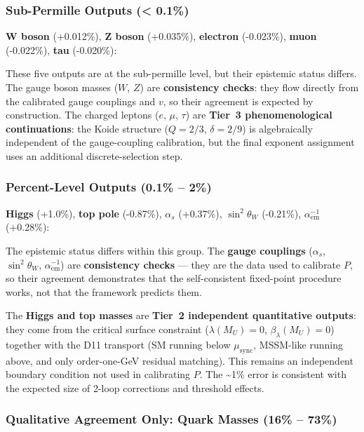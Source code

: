 \subsubsection{Sub-Permille Outputs (\textless{} 0.1\%)}\label{111-sub-permille-outputs--01}

\textbf{W boson} (+0.012\%), \textbf{Z boson} (+0.035\%), \textbf{electron} (-0.023\%), \textbf{muon} (-0.022\%), \textbf{tau} (-0.020\%):

These five outputs are at the sub-permille level, but their epistemic status differs. The gauge boson masses (\(W\), \(Z\)) are \textbf{consistency checks}: they flow directly from the calibrated gauge couplings and \(v\), so their agreement is expected by construction. The charged leptons (\(e\), \(\mu\), \(\tau\)) are \textbf{Tier~3 phenomenological continuations}: the Koide structure (\(Q = 2/3\), \(\delta = 2/9\)) is algebraically independent of the gauge-coupling calibration, but the final exponent assignment uses an additional discrete-selection step.

\subsubsection{Percent-Level Outputs (0.1\% -- 2\%)}\label{112-percent-level-outputs-01--2}

\textbf{Higgs} (+1.0\%), \textbf{top pole} (-0.87\%), \textbf{\(\alpha_s\)} (+0.37\%), \textbf{\(\sin^2\theta_W\)} (-0.21\%), \textbf{\(\alpha_{\text{em}}^{-1}\)} (+0.28\%):

The epistemic status differs within this group. The \textbf{gauge couplings} (\(\alpha_s\), \(\sin^2\theta_W\), \(\alpha_{\text{em}}^{-1}\)) are \textbf{consistency checks} --- they are the data used to calibrate \(P\), so their agreement demonstrates that the self-consistent fixed-point procedure works, not that the framework predicts them.

The \textbf{Higgs and top masses} are \textbf{Tier~2 independent quantitative outputs}: they come from the critical surface constraint (\(\lambda(M_U) = 0\), \(\beta_\lambda(M_U) = 0\)) together with the D11 transport (SM running below \(\mu_{\mathrm{sync}}\), MSSM-like running above, and only order-one-GeV residual matching). This remains an independent boundary condition not used in calibrating \(P\). The \textasciitilde1\% error is consistent with the expected size of 2-loop corrections and threshold effects.

\subsubsection{Qualitative Agreement Only: Quark Masses (16\% -- 73\%)}\label{113-qualitative-agreement-only-quark-masses-16--73}

